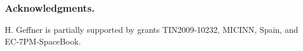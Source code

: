 \documentclass[letterpaper]{article}
\newcommand{\Omit}[1]{}
\begin{document}
\Omit{
 MCTS methods suggest the use of alternative leaf expansion
strategies for problems with very large branching factors; anytime heuristic search methods
suggest  the use of labels and upper bounds for pruning the search,
the decomposition of the value function  in the form $g+h$ typical of A* \cite{chakrabarti:g+h,hansen:lao},
and the use of a heuristic multiplier parameter $W > 1$ possibly adjustable \cite{richter:w,thayer-ruml:anytime}
for speeding up the search for the goal and subsequent pruning.}


\subsubsection{Acknowledgments.}
H. Geffner is partially supported by grants
TIN2009-10232, MICINN, Spain, and EC-7PM-SpaceBook.




\end{document}
